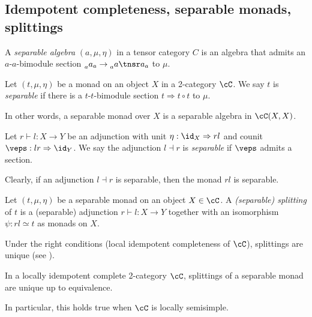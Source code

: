 \documentclass[12pt]{article}
\begin{document}
\subsection{Idempotent completeness, separable monads, splittings}

\begin{definition}
A \emph{separable algebra} $(a,\mu,\eta)$ in a tensor category $C$
is an algebra that admits an $a$-$a$-bimodule section
$\prescript{}{a}a_a \to \prescript{}{a}a \tnsr a_a$
to $\mu$.
\end{definition}

\begin{definition}
Let $(t, \mu, \eta)$ be a monad on an object $X$
in a 2-category $\cC$.
We say $t$ is \emph{separable} if there is a
$t$-$t$-bimodule section
$t \Rightarrow t \circ t$ to $\mu$.
\end{definition}

In other words, a separable monad over $X$
is a separable algebra in $\cC(X,X)$.

\begin{definition}
Let $r \vdash l: X \to Y$ be an adjunction
with unit $\eta: \id_X \Rightarrow rl$
and counit $\veps: lr \Rightarrow \id_Y$.
We say the adjunction $l \dashv r$ is \emph{separable}
if $\veps$ admits a section.
\end{definition}

Clearly, if an adjunction $l \dashv r$ is separable,
then the monad $rl$ is separable.

\begin{definition}
Let $(t,\mu,\eta)$ be a separable monad on
an object $X \in \cC$.
A \emph{(separable) splitting} of $t$ is a (separable) adjunction
$r \vdash l: X \to Y$
together with an isomorphism
$\psi: rl \simeq t$ as monads on $X$.
\end{definition}

Under the right conditions
(local idempotent completeness of $\cC$),
splittings are unique (see ).


\begin{proposition}
\label{p:splitting-unique}
In a locally idempotent complete 2-category $\cC$,
splittings of a separable monad are unique
up to equivalence.
\end{proposition}

In particular, this holds true when $\cC$
is locally semisimple.
\end{document}
